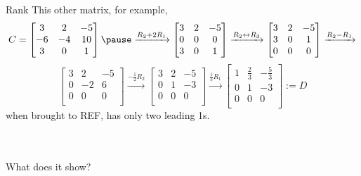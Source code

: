 \documentclass{beamer}
\begin{document}
\begin{frame}{Rank}
 This other matrix, for example, 
\[ C=\begin{bmatrix}
            3 & 2 & -5 \\
            -6 & -4 & 10 \\
            3 & 0 & 1 \\
        \end{bmatrix} \pause 
        \xrightarrow{R_2+2 R_1} 
        \begin{bmatrix}
        3 & 2 & -5 \\
            0 & 0 & 0 \\
            3 & 0 & 1 \\
         \end{bmatrix}
        \xrightarrow{R_2\leftrightarrow R_3} 
        \begin{bmatrix}
        3 & 2 & -5 \\
            3 & 0 & 1 \\
            0 & 0 & 0 \\
         \end{bmatrix}
        \xrightarrow{R_2- R_1} \]\[
        \begin{bmatrix}
        3 & 2 & -5 \\
            0 & -2 & 6 \\
            0 & 0 & 0 \\
         \end{bmatrix}
        \xrightarrow{-\frac{1}{2}R_2} 
        \begin{bmatrix}
        3 & 2 & -5 \\
            0 & 1 & -3 \\
            0 & 0 & 0 \\
         \end{bmatrix}
        \xrightarrow{\frac{1}{3}R_1} 
        \begin{bmatrix}
        1 & \frac{2}{3} & -\frac{5}{3} \\
            0 & 1 & -3 \\
            0 & 0 & 0 \\
         \end{bmatrix}:=D
        \]
\pause when brought to REF, has only two leading 1s. \pause 

\\ \\ \medskip What does it show?

\end{frame}
\end{document}
